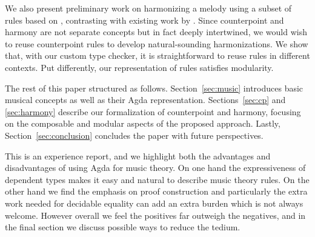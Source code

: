 
We also present preliminary work on harmonizing a melody using
a subset of rules based on \citet{piston-harmony}, contrasting with
existing work by \citet{koops-fharm}. Since counterpoint and
harmony are not separate concepts but in fact deeply intertwined, we
would wish to reuse counterpoint rules to develop natural-sounding
harmonizations.  We show that, with our custom type checker, it is
straightforward to reuse rules in different contexts.  Put differently,
our representation of rules satisfies modularity.

The rest of this paper structured as follows.  Section~\ref{sec:music}
introduces basic musical concepts as well as their Agda representation.
Sections~\ref{sec:cp} and \ref{sec:harmony} describe our formalization
of counterpoint and harmony, focusing on the composable and
modular aspects of the proposed approach.  Lastly,
Section~\ref{sec:conclusion} concludes the paper with future perspectives.

This is an experience report, and we highlight both the advantages and
disadvantages of using Agda for music theory. On one hand the
expressiveness of dependent types makes it easy and natural to
describe music theory rules. On the other hand we find the emphasis on proof
construction and particularly the extra work needed for decidable
equality can add an extra burden which is not always welcome. However
overall we feel the positives far outweigh the negatives, and in the
final section we discuss possible ways to reduce the tedium.

